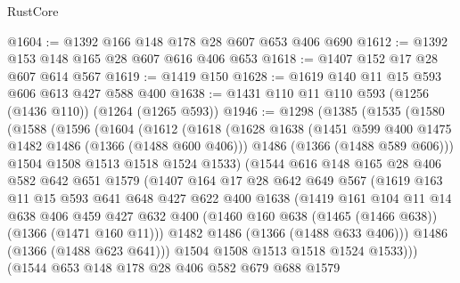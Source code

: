 \begin{lexlean}{RustCore}
\begin{coremodule}
@1604 := @1392 @166 @148 @178 @28 @607 @653 @406 @690
@1612 := @1392 @153 @148 @165 @28 @607 @616 @406 @653
@1618 := @1407 @152 @17 @28 @607 @614 @567
@1619 := @1419 @150
@1628 := @1619 @140 @11 @15 @593 @606 @613 @427 @588 @400
@1638 := @1431 @110 @11 @110 @593 (@1256 (@1436 @110)) (@1264 (@1265 @593))
@1946 := @1298
    (@1385
      (@1535
        (@1580
          (@1588
            (@1596
              (@1604
                (@1612
                  (@1618
                    (@1628
                      @1638
                      (@1451 @599 @400 @1475 @1482 @1486 (@1366 (@1488 @600 @406)))
                      @1486
                      (@1366 (@1488 @589 @606)))
                    @1504
                    @1508
                    @1513
                    @1518
                    @1524
                    @1533)
                  (@1544
                    @616
                    @148
                    @165
                    @28
                    @406
                    @582
                    @642
                    @651
                    @1579
                    (@1407
                      @164
                      @17
                      @28
                      @642
                      @649
                      @567
                      (@1619
                        @163
                        @11
                        @15
                        @593
                        @641
                        @648
                        @427
                        @622
                        @400
                        @1638
                        (@1419
                          @161
                          @104
                          @11
                          @14
                          @638
                          @406
                          @459
                          @427
                          @632
                          @400
                          (@1460 @160 @638 (@1465 (@1466 @638)) (@1366 (@1471 @160 @11)))
                          @1482
                          @1486
                          (@1366 (@1488 @633 @406)))
                        @1486
                        (@1366 (@1488 @623 @641)))
                      @1504
                      @1508
                      @1513
                      @1518
                      @1524
                      @1533)))
                (@1544
                  @653
                  @148
                  @178
                  @28
                  @406
                  @582
                  @679
                  @688
                  @1579

\end{coremodule}
\end{lexlean}
